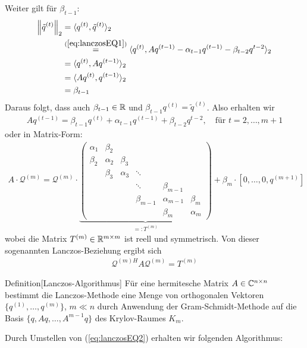 Weiter gilt für $\beta_{t-1}$:
%
\begin{align*}
  \vertn{2}{\tilde{q}^{(t)}}_2 
  &= \langle q^{(t)}, \tilde{q}^{(t)}\rangle_2 \\
  &\stackrel{(\ref{eq:lanczosEQ1})}{=} \langle q^{(t)}, Aq^{(t-1)}-\alpha_{t-1}q^{(t-1)}-\beta_{t-2}q^{t-2}\rangle_2 \\
  &= \langle q^{(t)}, Aq^{(t-1)}\rangle_2 \\
  &= \langle Aq^{(t)}, q^{(t-1)}\rangle_2 \\
  &= \beta_{t-1}
\end{align*}
%
Daraus folgt, dass auch $\beta_{t-1}\in\mathbb R$ und $\beta_{t-1}q^{(t)} = \tilde{q}^{(t)}$. Also erhalten wir 
\begin{align*}
  Aq^{(t-1)} = \beta_{t-1}q^{(t)} + \alpha_{t-1}q^{(t-1)} + \beta_{t-2}q^{t-2},\quad\text{für } t=2,\dots,m+1
  \tag{2}\label{eq:lanczosEQ2}
\end{align*}
%
oder in Matrix-Form:
%
\begin{align*}A\cdot \mathcal{Q}^{(m)} = \mathcal{Q}^{(m)}\cdot\underbrace{
  \begin{pmatrix}
    \alpha_1 & \beta_2 & & & & \\
    \beta_2 & \alpha_2 & \beta_3 & & & \\
    & \beta_3 & \alpha_3 & \ddots & & \\
    & & & \ddots & \beta_{m-1} & \\
    & & & \beta_{m-1} & \alpha_{m-1} & \beta_m \\
    & & & & \beta_m & \alpha_m
  \end{pmatrix}}_{=:T^{(m)}} + \beta_m\cdot[0,\dots,0,q^{(m+1)}]
\end{align*}
%
wobei die Matrix $T^{(m)}\in\mathbb R^{m\times m}$ ist reell und symmetrisch. Von dieser sogenannten Lanczos-Beziehung
ergibt sich
%
\begin{align*}
  \mathcal{Q}^{(m)H} A \mathcal{Q}^{(m)} = T^{(m)}
\end{align*} 
%
\begin{colbox}{Definition}[Lanczos-Algorithmus]
  Für eine hermitesche Matrix $A\in\mathbb C  ^{n\times n}$ bestimmt die Lanczos-Methode eine Menge von orthogonalen 
  Vektoren $\{q^{(1)},\dots,q^{(m)}\}$, $m\ll n$ durch Anwendung der Gram-Schmidt-Methode auf die Basis 
  $\{q,Aq,\dots,A^{m-1}q\}$ des Krylov-Raumes $K_m$.
\end{colbox}

Durch Umstellen von (\ref{eq:lanczosEQ2}) erhalten wir folgenden Algorithmus:

